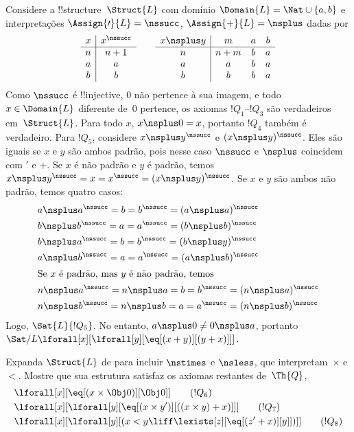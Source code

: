 \documentclass[../../../include/open-logic-section]{subfiles}
\begin{document}
\begin{ex}
 Considere a !!{structure}~$\Struct{L}$ com
domínio $\Domain{L} = \Nat \cup \{a, b\}$ e interpretações
$\Assign{\prime}{L} = \nssucc$, $\Assign{+}{L} = \nsplus$ dadas por
\[
\begin{array}{c|c}
  x & x^\nssucc \\
  \hline
  n & n+1 \\
  a & a\\
  b & b
\end{array}
\qquad
\begin{array}{c|ccc}
  x \nsplus y & m & a & b\\
  \hline
  n & n+m & b & a\\
  a & a & b & a\\
  b & b & b & a
\end{array}
\]
Como $\nssucc$ é !!{injective}, $0$ não pertence à sua imagem, e todo
$x \in \Domain{L}$ diferente de~$0$ pertence, os axiomas
$!Q_1$--$!Q_3$ são verdadeiros em~$\Struct{L}$. Para todo $x$,
$x \nsplus 0 = x$, portanto $!Q_4$ também é verdadeiro. Para $!Q_5$,
considere $x \nsplus y^\nssucc$ e $(x \nsplus y)^\nssucc$. Eles são
iguais se $x$ e $y$ são ambos padrão, pois nesse caso $\nssucc$ e
$\nsplus$ coincidem com $\prime$ e $+$. Se $x$ é não padrão e $y$ é
padrão, temos $x \nsplus y^\nssucc = x = x^\nssucc = (x \nsplus
y)^\nssucc$. Se $x$ e $y$ são ambos não padrão, temos quatro casos:
\begin{align*}
&  a \nsplus a^\nssucc  = b = b^\nssucc = (a \nsplus a)^\nssucc\\
&  b \nsplus b^\nssucc  = a = a^\nssucc = (b \nsplus b)^\nssucc\\
&  b \nsplus a^\nssucc  = b = b^\nssucc = (b \nsplus y)^\nssucc\\
&  a \nsplus b^\nssucc  = a = a^\nssucc = (a \nsplus b)^\nssucc\\
\intertext{Se $x$ é padrão, mas $y$ é não padrão, temos}
&  n \nsplus a^\nssucc  = n \nsplus a = b = b^\nssucc = (n \nsplus a)^\nssucc\\
&  n \nsplus b^\nssucc  = n \nsplus b = a = a^\nssucc = (n \nsplus b)^\nssucc
\end{align*}
Logo, $\Sat{L}{!Q_5}$. No entanto, $a \nsplus 0 \neq 0 \nsplus a$, portanto
$\Sat/{L}{\lforall[x][\lforall[y][\eq[(x+y)][(y+x)]]]}$.
\end{ex}

\begin{prob}
Expanda $\Struct{L}$ de  para
incluir $\nstimes$ e $\nsless$, que interpretam~$\times$ e $<$. Mostre
que sua estrutura satisfaz os axiomas restantes de~$\Th{Q}$,
\begin{align*}
& \lforall[x][\eq[(x \times \Obj 0)][\Obj 0]] \tag{$!Q_6$}\\ &
  \lforall[x][\lforall[y][\eq[(x \times y')][((x \times y) + x)]]]
  \tag{$!Q_7$}\\ & \lforall[x][\lforall[y][(x < y \liff \lexists[z][\eq[(z'+x)][y]])]] \tag{$!Q_8$}
\end{align*}
\end{prob}
\end{document}
